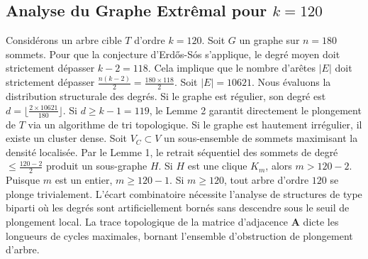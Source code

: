\documentclass[11pt,a4paper]{article}
\begin{document}
\subsection{Analyse du Graphe Extr\^emal pour $k=120$}
Consid\'erons un arbre cible $T$ d'ordre $k=120$.
Soit $G$ un graphe sur $n=180$ sommets.
Pour que la conjecture d'Erd\H{o}s-S\'os s'applique, le degr\'e moyen doit strictement d\'epasser $k-2 = 118$.
Cela implique que le nombre d'ar\^etes $|E|$ doit strictement d\'epasser $\frac{n(k-2)}{2} = \frac{180 \times 118}{2}$.
Soit $|E| = 10621$.
Nous \'evaluons la distribution structurale des degr\'es. Si le graphe est r\'egulier, son degr\'e est $d = \lfloor \frac{2 \times 10621}{180} \rfloor$.
Si $d \geq k-1 = 119$, le Lemme 2 garantit directement le plongement de $T$ via un algorithme de tri topologique.
Si le graphe est hautement irr\'egulier, il existe un cluster dense. Soit $V_C \subset V$ un sous-ensemble de sommets maximisant la densit\'e localis\'ee.
Par le Lemme 1, le retrait s\'equentiel des sommets de degr\'e $\leq \frac{120-2}{2}$ produit un sous-graphe $H$.
Si $H$ est une clique $K_{m}$, alors $m > 120-2$. Puisque $m$ est un entier, $m \geq 120-1$. Si $m \geq 120$, tout arbre d'ordre $120$ se plonge trivialement.
L'\'ecart combinatoire n\'ecessite l'analyse de structures de type biparti o\`u les degr\'es sont artificiellement born\'es sans descendre sous le seuil de plongement local. La trace topologique de la matrice d'adjacence $\mathbf{A}$ dicte les longueurs de cycles maximales, bornant l'ensemble d'obstruction de plongement d'arbre.
\end{document}

